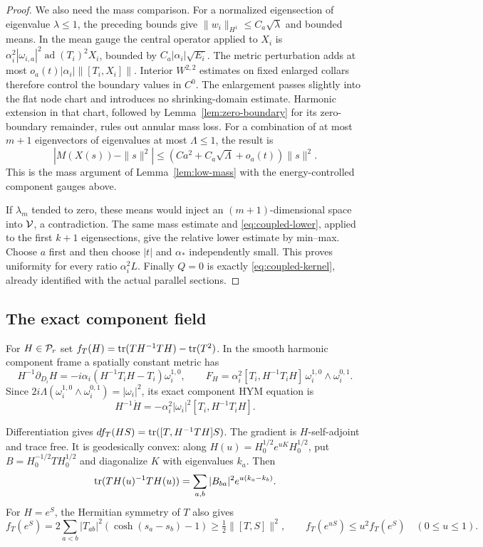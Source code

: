\begin{proof}
We also need the mass comparison. For a
normalized eigensection of eigenvalue
$\lambda\le1$, the preceding bounds give
$\|w_i\|_{H^1}\le C_a\sqrt\lambda$ and bounded
means. In the mean gauge the central operator
applied to $X_i$ is
$\alpha_i^2|\omega_{i,a}|^2\operatorname{ad}(T_i)^2X_i$,
bounded by $C_a|\alpha_i|\sqrt{E_i}$.
The metric perturbation adds at most
$o_a(t)|\alpha_i|\|[T_i,X_i]\|$.
Interior $W^{2,2}$ estimates on fixed enlarged
collars therefore control the boundary
values in $C^0$. The enlargement passes
slightly into the flat node chart and
introduces no shrinking-domain estimate.
Harmonic extension in that chart, followed
by Lemma~\ref{lem:zero-boundary} for its
zero-boundary remainder, rules out annular
mass loss. For a combination of at most
$m+1$ eigenvectors of eigenvalues at most
$\Lambda\le1$, the result is
\[
 |M(X(s))-\|s\|^2|
 \le(Ca^2+C_a\sqrt\Lambda+o_a(t))\|s\|^2 .
\]
This is the mass argument of
Lemma~\ref{lem:low-mass} with the
energy-controlled component gauges above.

If $\lambda_m$ tended to zero, these means
would inject an $(m+1)$-dimensional space
into $\mathcal V$, a contradiction. The same mass
estimate and \eqref{eq:coupled-lower},
applied to the first $k+1$ eigensections,
give the relative lower estimate by min--max.
Choose $a$ first and then choose $|t|$ and
$\alpha_*$ independently small. This proves
uniformity for every ratio $\alpha_i^2L$.
Finally $Q=0$ is exactly
\eqref{eq:coupled-kernel}, already identified
with the actual parallel sections.
\end{proof}

\subsection{The exact component field}
For $H\in\mathcal P_r$ set
$f_T(H)=\operatorname{tr}(TH^{-1}TH)-\operatorname{tr}(T^2)$.
In the smooth harmonic component frame a
spatially constant metric has
\[
 H^{-1}\partial_{D_i}H
 =-i\alpha_i(H^{-1}T_iH-T_i)\omega_i^{1,0},
 \qquad
 F_H=\alpha_i^2[T_i,H^{-1}T_iH]\,
                   \omega_i^{1,0}\wedge\omega_i^{0,1}.
\]
Since $2i\Lambda(\omega_i^{1,0}\wedge
\omega_i^{0,1})=|\omega_i|^2$, its exact
component HYM equation is
\[
 H^{-1}\dot H=-\alpha_i^2|\omega_i|^2[T_i,H^{-1}T_iH].
\]

Differentiation gives
$df_T(HS)=\operatorname{tr}([T,H^{-1}TH]S)$.
The gradient is $H$-self-adjoint and trace
free. It is geodesically convex: along
$H(u)=H_0^{1/2}e^{uK}H_0^{1/2}$, put
$B=H_0^{-1/2}TH_0^{1/2}$ and diagonalize
$K$ with eigenvalues $k_a$. Then
\[
 \operatorname{tr}(TH(u)^{-1}TH(u))
       =\sum_{a,b}|B_{ba}|^2e^{u(k_a-k_b)}.
\]
For $H=e^S$, the Hermitian symmetry of $T$
also gives
\[
 f_T(e^S)=2\sum_{a<b}|T_{ab}|^2
                      (\cosh(s_a-s_b)-1)
 \ge\tfrac12\|[T,S]\|^2,\qquad
 f_T(e^{uS})\le u^2f_T(e^S)\quad(0\le u\le1).
\]

